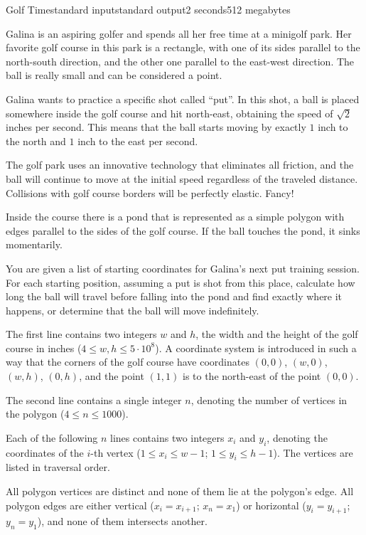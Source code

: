 \begin{problem}{Golf Time}{standard input}{standard output}{2 seconds}{512 megabytes}

Galina is an aspiring golfer and spends all her free time at a minigolf park. Her favorite golf course in this park is a rectangle, with one of its sides parallel to the north-south direction, and the other one parallel to the east-west direction. The ball is really small and can be considered a point.

Galina wants to practice a specific shot called ``put''. In this shot, a ball is placed somewhere inside the golf course and hit north-east, obtaining the speed of $\sqrt{2}$ inches per second. This means that the ball starts moving by exactly $1$ inch to the north and $1$ inch to the east per second. 

The golf park uses an innovative technology that eliminates all friction, and the ball will continue to move at the initial speed regardless of the traveled distance. Collisions with golf course borders will be perfectly elastic. Fancy!

Inside the course there is a pond that is represented as a simple polygon with edges parallel to the sides of the golf course. If the ball touches the pond, it sinks momentarily.

You are given a list of starting coordinates for Galina's next put training session. For each starting position, assuming a put is shot from this place, calculate how long the ball will travel before falling into the pond and find exactly where it happens, or determine that the ball will move indefinitely.

\InputFile
The first line contains two integers $w$ and $h$, the width and the height of the golf course in inches ($4 \le w, h \le 5 \cdot 10^8$). A coordinate system is introduced in such a way that the corners of the golf course have coordinates $(0, 0)$, $(w, 0)$, $(w, h)$, $(0, h)$, and the point $(1, 1)$ is to the north-east of the point $(0, 0)$.

The second line contains a single integer $n$, denoting the number of vertices in the polygon ($4 \le n \le 1000$).

Each of the following $n$ lines contains two integers $x_i$ and $y_i$, denoting the coordinates of the $i$-th vertex ($1 \le x_i \le w - 1$; $1 \le y_i \le h - 1$). The vertices are listed in traversal order.

All polygon vertices are distinct and none of them lie at the polygon's edge.
All polygon edges are either vertical ($x_i = x_{i+1}$; $x_n=x_1$) or horizontal ($y_i = y_{i+1}$; $y_n=y_1$), and none of them intersects another.


\end{problem}
